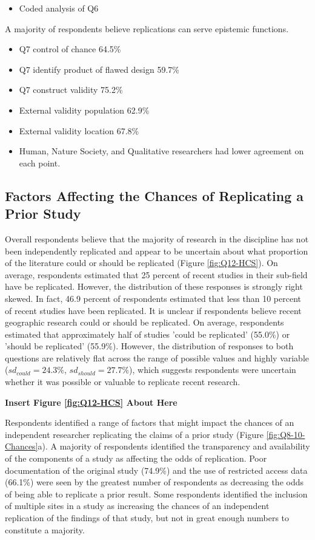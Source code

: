 \documentclass[]{interact}
\theoremstyle{plain}%
\theoremstyle{definition}
\theoremstyle{remark}
\begin{document}
\begin{itemize}
    \item Coded analysis of Q6
\end{itemize}

A majority of respondents believe replications can serve epistemic functions.
\begin{itemize}
    \item Q7 control of chance 64.5\%
    \item Q7 identify product of flawed design 59.7\%
    \item Q7 construct validity 75.2\%
    \item External validity population 62.9\%
    \item External validity location 67.8\%
    \item Human, Nature Society, and Qualitative researchers had lower agreement on each point.
\end{itemize}

\subsection*{Factors Affecting the Chances of Replicating a Prior Study}
Overall respondents believe that the majority of research in the discipline has not been independently replicated and appear to be uncertain about what proportion of the literature could or should be replicated (Figure \ref{fig:Q12-HCS}). 
On average, respondents estimated that 25 percent of recent studies in their sub-field have be replicated. 
However, the distribution of these responses is strongly right skewed.
In fact, 46.9 percent of respondents estimated that less than 10 percent of recent studies have been replicated.
It is unclear if respondents believe recent geographic research could or should be replicated.
On average, respondents estimated that approximately half of studies 'could be replicated' (55.0\%) or 'should be replicated' (55.9\%). However, the distribution of responses to both questions are relatively flat across the range of possible values and highly variable (\textit{$sd_{could}=24.3\%$}, \textit{$sd_{should}=27.7\%$}), which suggests 
respondents were uncertain whether it was possible or valuable to replicate recent research.  

\begin{center}
\textbf{Insert Figure \ref{fig:Q12-HCS} About Here}
\end{center}

Respondents identified a range of factors that might impact the chances of an independent researcher replicating the claims of a prior study (Figure \ref{fig:Q8-10-Chances}a).
A majority of respondents identified the transparency and availability of the components of a study as affecting the odds of replication. 
Poor documentation of the original study (74.9\%) and the use of restricted access data (66.1\%) were seen by the greatest number of respondents as decreasing the odds of being able to replicate a prior result. 
Some respondents identified the inclusion of multiple sites in a study as increasing the chances of an independent replication of the findings of that study, but not in great enough numbers to constitute a majority. 
\end{document}
